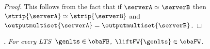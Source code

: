 \begin{proof}
This follows from the fact that if $\serverA \simeq \serverB$ then
$\strip{\serverA} \simeq \strip{\serverB}$ and $\outputmultiset{\serverA} = \outputmultiset{\serverB}$.
\end{proof}


\noindent
\textbf{}. \textit{For every LTS~$\genlts \in \obaFB$, $\liftFW{\genlts} \in \obaFW$}.

